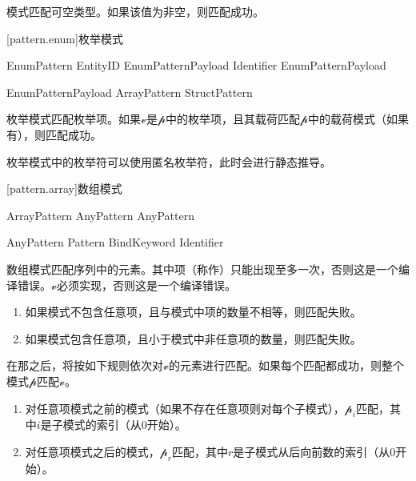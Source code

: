 \pnum
{}模式匹配可空类型。如果该值为非空，则匹配成功。

[pattern.enum]{枚举模式}

\begin{bnf}{EnumPattern}
    EntityID EnumPatternPayload\bnfq \br
     Identifier EnumPatternPayload\bnfq
\end{bnf}

\begin{bnf}{EnumPatternPayload}
    ArrayPattern \br
    StructPattern
\end{bnf}

\pnum
枚举模式匹配枚举项。如果$\mathcal{v}$是$\mathcal{p}$中的枚举项，且其载荷匹配$\mathcal{p}$中的载荷模式（如果有），则匹配成功。

\pnum
枚举模式中的枚举符可以使用匿名枚举符，此时会进行静态推导。

[pattern.array]{数组模式}

\begin{bnf}{ArrayPattern}
    \terminal{[} AnyPattern \bnflp\terminal{,} AnyPattern\bnfrp\bnfs\ \terminal{]}
\end{bnf}

\begin{bnf}{AnyPattern}
    Pattern\br
     \br
    BindKeyword  Identifier
\end{bnf}

\pnum
数组模式匹配序列中的元素。其中项（称作）只能出现至多一次，否则这是一个编译错误。$\mathcal{v}$必须实现，否则这是一个编译错误。

\begin{enumerate}
    \item 如果模式不包含任意项，且与模式中项的数量不相等，则匹配失败。
    \item 如果模式包含任意项，且小于模式中非任意项的数量，则匹配失败。
\end{enumerate}

\pnum
在那之后，将按如下规则依次对$\mathcal{v}$的元素进行匹配。如果每个匹配都成功，则整个模式$\mathcal{p}$匹配$\mathcal{v}$。

\begin{enumerate}
    \item 对任意项模式之前的模式（如果不存在任意项则对每个子模式），$\mathcal{p}_i$匹配，其中$i$是子模式的索引（从0开始）。
    \item 对任意项模式之后的模式，$\mathcal{p}_r$匹配，其中$r$是子模式从后向前数的索引（从0开始）。
\end{enumerate}

